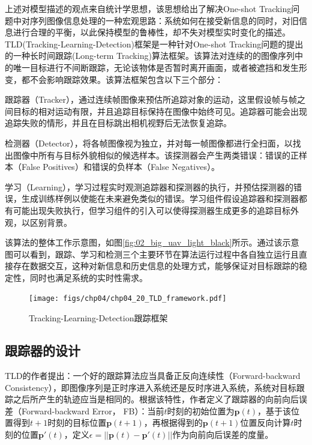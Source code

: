 上述对模型描述的观点来自统计学思想，该思想给出了解决One-shot Tracking问题中对序列图像信息处理的一种宏观思路：系统如何在接受新信息的同时，对旧信息进行合理的平衡，以此保持模型的鲁棒性，却不失对模型实时变化的描述。TLD(Tracking-Learning-Detection)\cite{kalal2012tracking}框架是一种针对One-shot Tracking问题的提出的一种长时间跟踪(Long-term Tracking)算法框架。该算法对连续的的图像序列中的唯一目标进行不间断跟踪，无论该物体是否暂时离开画面，或者被遮挡和发生形变，都不会影响跟踪效果。该算法框架包含以下三个部分：
\begin{compactenum}
	\item 跟踪器（Tracker），通过连续帧图像来预估所追踪对象的运动，这里假设帧与帧之间目标的相对运动有限，并且追踪目标保持在图像中始终可见。追踪器可能会出现追踪失败的情形，并且在目标跳出相机视野后无法恢复追踪。
	\item 检测器（Detector），将各帧图像视为独立，并对每一帧图像都进行全扫面，以找出图像中所有与目标外貌相似的候选样本。该探测器会产生两类错误：错误的正样本（False Positives）和错误的负样本（False Negatives）。
	\item 学习（Learning），学习过程实时观测追踪器和探测器的执行，并预估探测器的错误，生成训练样例以使能在未来避免类似的错误。学习组件假设追踪器和探测器都有可能出现失败执行，但学习组件的引入可以使得探测器生成更多的追踪目标外观，以区别背景。
\end{compactenum}

该算法的整体工作示意图，如图\ref{fig:02_big_uav_light_black}所示\cite{kalal2012tracking}。通过该示意图可以看到，跟踪、学习和检测三个主要环节在算法运行过程中各自独立运行且直接存在数据交互，这种对新信息和历史信息的处理方式，能够保证对目标跟踪的稳定性，同时也满足系统的实时性需求。

\begin{figure}[ht]   
	\centering
	\texttt{[image: figs/chp04/chp04\_20\_TLD\_framework.pdf]}
	\caption{Tracking-Learning-Detection跟踪框架}
	\label{fig:chp04_20_TLD_framework}
\end{figure}


\subsection{跟踪器的设计}
TLD的作者提出：一个好的跟踪算法应当具备正反向连续性（Forward-backward Consistency）\cite{kalal2010forward}，即图像序列是正时序进入系统还是反时序进入系统，系统对目标跟踪之后所产生的轨迹应当是相同的。根据该特性，作者定义了跟踪器的向前向后误差（Forward-backward Error， FB）：当前$t$时刻的初始位置为$\mathbf{p}(t)$，基于该位置得到$t+1$时刻的目标位置$\mathbf{p}(t+1)$，再根据得到的$\mathbf{p}(t+1)$位置反向计算$t$时刻的位置$ \mathbf{p}'(t)$，定义$\epsilon =||\mathbf{p}(t)-\mathbf{p}'(t)||$作为向前向后误差的度量。

